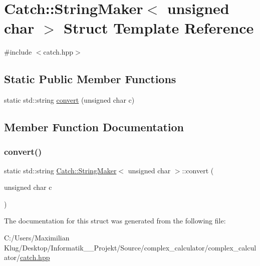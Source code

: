 \hypertarget{struct_catch_1_1_string_maker_3_01unsigned_01char_01_4}{}\section{Catch\+:\+:String\+Maker$<$ unsigned char $>$ Struct Template Reference}
\label{struct_catch_1_1_string_maker_3_01unsigned_01char_01_4}


{\ttfamily \#include $<$catch.\+hpp$>$}

\subsection*{Static Public Member Functions}
\begin{DoxyCompactItemize}
\item 
static std\+::string \mbox{\hyperlink{struct_catch_1_1_string_maker_3_01unsigned_01char_01_4_a7cddb1df26275b9a8e631466eb122f59}{convert}} (unsigned char c)
\end{DoxyCompactItemize}


\subsection{Member Function Documentation}
\mbox{\label{struct_catch_1_1_string_maker_3_01unsigned_01char_01_4_a7cddb1df26275b9a8e631466eb122f59}} 
\subsubsection{\texorpdfstring{convert()}{convert()}}
{\footnotesize\ttfamily static std\+::string \mbox{\hyperlink{struct_catch_1_1_string_maker}{Catch\+::\+String\+Maker}}$<$ unsigned char $>$\+::convert (\begin{DoxyParamCaption}\item[{unsigned char}]{c }\end{DoxyParamCaption})\hspace{0.3cm}{\ttfamily [static]}}



The documentation for this struct was generated from the following file\+:\begin{DoxyCompactItemize}
\item 
C\+:/\+Users/\+Maximilian Klug/\+Desktop/\+Informatik\+\_\+\_\+\+Projekt/\+Source/complex\+\_\+calculator/complex\+\_\+calculator/\mbox{\hyperlink{catch_8hpp}{catch.\+hpp}}\end{DoxyCompactItemize}
